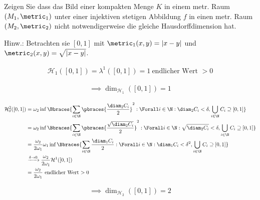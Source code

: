 
\begin{exercise}

Zeigen Sie dass das Bild einer kompakten Menge $K$ in einem metr. Raum $(M_1, \metric_1)$ unter einer injektiven stetigen Abbildung $f$ in einen metr. Raum $(M_2, \metric_2)$ nicht notwendigerweise die gleiche Hausdorffdimension hat.

Hinw.:
Betrachten sie $[0, 1]$ mit $\metric_1(x, y) = |x - y|$ und $\metric_2(x, y) = \sqrt{|x - y|}$.

\end{exercise}


\begin{solution}

\phantom{}


\begin{align*}
    \mathcal{H}_1([0, 1]) = \lambda^1([0, 1]) = 1
    ~\text{endlicher Wert $> 0$}
\end{align*}

\begin{align*}
    \implies
    \dim_{\mathcal{H}_1}([0, 1]) = 1
\end{align*}

\begin{align*}
    \mathcal{H}_\delta^2([0, 1])
    & =
    \omega_2
    \inf
    \Bbraces
    {
        \sum_{i \in \N}
            \pbraces
            {
                \frac{\diam_2 C_i}{2}
            }^2:
        \Forall i \in \N:
            \diam_2 C_i < \delta,
        \bigcup_{i \in \N}
            C_i
        \supseteq
        [0, 1]
    } \\
    & =
    \omega_2
    \inf
    \Bbraces
    {
        \sum_{i \in \N}
            \pbraces
            {
                \frac{\sqrt{\diam_2 C_i}}{2}
            }^2:
        \Forall i \in \N:
            \sqrt{\diam_2 C_i} < \delta,
        \bigcup_{i \in \N}
            C_i
        \supseteq
        [0, 1]
    } \\
    & =
    \frac{\omega_2}{2 \omega_1}
    \omega_1
    \inf
    \Bbraces
    {
        \sum_{i \in \N}
            \frac{\diam_1 C_i}{2}:
        \Forall i \in \N:
            \diam_1 C_i < \delta^2,
        \bigcup_{i \in \N}
            C_i
        \supseteq
        [0, 1]
    } \\
    & \xrightarrow{\delta \to 0}
    \frac{\omega_2}{2 \omega_1}
    \mathcal{H}^1([0, 1]) \\
    & =
    \frac{\omega_2}{2 \omega_1}
    ~\text{endlicher Wert $> 0$}
\end{align*}

\begin{align*}
    \implies
    \dim_{\mathcal{H}_2}([0, 1]) = 2
\end{align*}

\end{solution}


